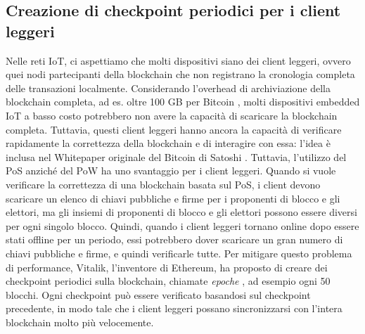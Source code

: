 \subsection{Creazione di checkpoint periodici per i client leggeri}
Nelle reti IoT, ci aspettiamo che molti dispositivi siano dei client leggeri, ovvero quei nodi partecipanti della blockchain che non registrano la cronologia completa delle transazioni localmente. Considerando l'overhead di archiviazione della blockchain completa, ad es. oltre 100 GB per Bitcoin \cite{c4}, molti dispositivi embedded IoT a basso costo potrebbero non avere la capacità di scaricare la blockchain completa. Tuttavia, questi client leggeri hanno ancora la capacità di verificare rapidamente la correttezza della blockchain e di interagire con essa: l'idea è inclusa nel Whitepaper originale del Bitcoin di Satoshi \cite{c21}.
Tuttavia, l'utilizzo del PoS anziché del PoW ha uno svantaggio per i client leggeri. Quando si vuole verificare la correttezza di una blockchain basata sul PoS, i client devono scaricare un elenco di chiavi pubbliche e firme per i proponenti di blocco e gli elettori, ma gli insiemi di proponenti di blocco
e gli elettori possono essere diversi per ogni singolo blocco. Quindi, quando i client leggeri tornano online dopo essere stati offline per un periodo, essi potrebbero dover scaricare un gran numero di chiavi pubbliche e firme, e quindi verificarle tutte. Per mitigare questo problema di performance, Vitalik, l'inventore di Ethereum, ha proposto di creare dei checkpoint periodici sulla blockchain, chiamate \emph{epoche} \cite{c6}, ad esempio ogni 50 blocchi. Ogni checkpoint
può essere verificato basandosi sul checkpoint precedente, in modo tale che i client leggeri possano sincronizzarsi con l'intera blockchain molto più velocemente.

